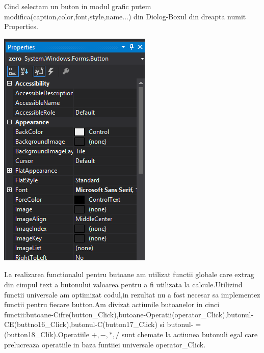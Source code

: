 Cind selectam un buton in modul grafic putem modifica(caption,color,font,style,name...) din Diolog-Boxul din dreapta numit Properties.\\
\begin{center}
\includegraphics[scale=1]{images/properties}\\
\end{center}
La realizarea functionalul pentru butoane am utilizat functii globale care extrag din cimpul text a butonului valoarea pentru a fi utilizata la calcule.Utilizind functii universale am optimizat codul,in rezultat nu a fost necesar sa implementez functii pentru fiecare button.Am divizat actiunile butoanelor in cinci functii:butoane-Cifre(button\_Click),butoane-Operatii(operator\_Click),butonul-CE(buttno16\_Click),butonul-C(button17\_Click) si butonul-$=$(button18\_Clik).Operatiile $+,-,*,/$ sunt chemate la actiunea butonuli egal care prelucreaza operatiile in baza funtiiei universale operator\_Click.\\
